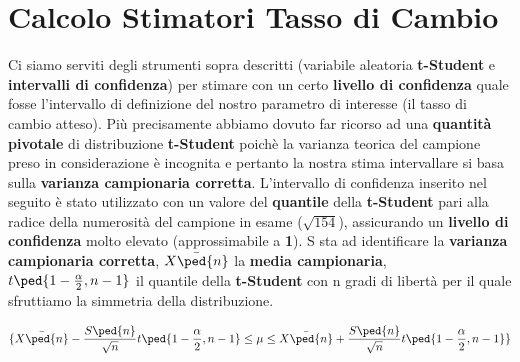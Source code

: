   \chapter{Calcolo Stimatori Tasso di Cambio}
	Ci siamo serviti degli strumenti sopra descritti (variabile aleatoria \textbf{t-Student} e \textbf{intervalli di confidenza}) per stimare con un certo \textbf{livello di confidenza} quale fosse l'intervallo di definizione del nostro parametro di interesse (il tasso di cambio atteso). Più precisamente abbiamo dovuto far ricorso ad una \textbf{quantità pivotale} di distribuzione \textbf{t-Student} poichè la varianza teorica del campione preso in considerazione è incognita e pertanto la nostra stima intervallare si basa sulla \textbf{varianza campionaria corretta}. L'intervallo di confidenza inserito nel seguito è stato utilizzato con un valore del \textbf{quantile} della \textbf{t-Student} pari alla radice della numerosità del campione in esame ($\sqrt{154}$), assicurando un \textbf{livello di confidenza} molto elevato (approssimabile a \textbf{1}). S sta ad identificare la \textbf{varianza campionaria corretta}, $\bar{X\ped{n}}$ la \textbf{media campionaria}, $t\ped{1-\frac{\alpha}{2},n-1}$ il quantile della \textbf{t-Student} con n gradi di libertà per il quale sfruttiamo la simmetria della distribuzione.

\[
\{\bar{X\ped{n}} - \frac{S\ped{n}}{\sqrt{n}}t\ped{1-\frac{\alpha}{2},n-1} \leq \mu \leq \bar{X\ped{n}} + \frac{S\ped{n}}{\sqrt{n}}t\ped{1-\frac{\alpha}{2},n-1}\}
\]  
  
    \label{sec:stimatori_tasso_cambio}